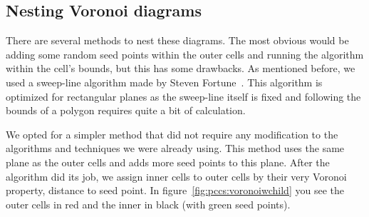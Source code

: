 \documentclass[11pt,a4paper,twocolumn]{article}
\begin{document}
\subsection{Nesting Voronoi diagrams}
There are several methods to nest these diagrams. The most obvious would be adding some random seed points within the outer cells and running the algorithm within the cell's bounds, but this has some drawbacks. As mentioned before, we used a sweep-line algorithm made by Steven Fortune~\cite{fortuneacm}. This algorithm is optimized for rectangular planes as the sweep-line itself is fixed and following the bounds of a polygon requires quite a bit of calculation. 

We opted for a simpler method that did not require any modification to the algorithms and techniques we were already using. This method uses the same plane as the outer cells and adds more seed points to this plane. After the algorithm did its job, we assign inner cells to outer cells by their very Voronoi property, distance to seed point. 
In figure~\ref{fig:pccs:voronoiwchild} you see the outer cells in red and the inner in black (with green seed points).
\end{document}
